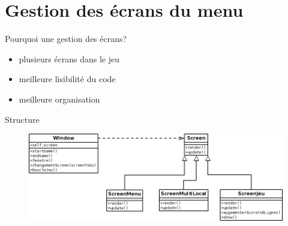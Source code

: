 \documentclass{beamer}
\begin{document}
	
\section{Gestion des écrans du menu}
	
	\begin{frame}{Pourquoi une gestion des écrans?}
    
    	\begin{itemize}
    	    \item plusieurs écrans dans le jeu
    	    \newline
    	    
    	    \item meilleure lisibilité du code
    	    \newline
    	    
    	    \item meilleure organisation
    	\end{itemize}
	\end{frame}
    
    
    \begin{frame}{Structure}
        \begin{figure}
            \centering
            \includegraphics[scale=0.37]{images/dia.png}
        \end{figure}
    \end{frame}
    
\end{document}

